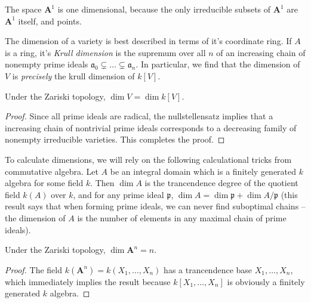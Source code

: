 \begin{example}
    The space $\mathbf{A}^1$ is one dimensional, because the only irreducible subsets of $\mathbf{A}^1$ are $\mathbf{A}^1$ itself, and points.
\end{example}

The dimension of a variety is best described in terms of it's coordinate ring. If $A$ is a ring, it's \emph{Krull dimension} is the supremum over all $n$ of an increasing chain of nonempty prime ideals $\mathfrak{a}_0 \subsetneq \dots \subsetneq \mathfrak{a}_n$. In particular, we find that the dimension of $V$ is {\it precisely} the krull dimension of $k[V]$.

\begin{theorem}
    Under the Zariski topology, $\dim V = \dim k[V]$.
\end{theorem}
\begin{proof}
    Since all prime ideals are radical, the nullstellensatz implies that a increasing chain of nontrivial prime ideals corresponds to a decreasing family of nonempty irreducible varieties. This completes the proof.
\end{proof}

To calculate dimensions, we will rely on the following calculational tricks from commutative algebra. Let $A$ be an integral domain which is a finitely generated $k$ algebra for some field $k$. Then $\dim A$ is the trancendence degree of the quotient field $k(A)$ over $k$, and for any prime ideal $\mathfrak{p}$, $\dim A = \dim \mathfrak{p} + \dim A/\mathfrak{p}$ (this result says that when forming prime ideals, we can never find suboptimal chains -- the dimension of $A$ is the number of elements in any maximal chain of prime ideals).

\begin{theorem}
    Under the Zariski topology, $\dim \mathbf{A}^n = n$.
\end{theorem}
\begin{proof}
    The field $k(\mathbf{A}^n) = k(X_1, \dots, X_n)$ has a trancendence base $X_1, \dots, X_n$, which immediately implies the result because $k[X_1, \dots, X_n]$ is obviously a finitely generated $k$ algebra.
\end{proof}

